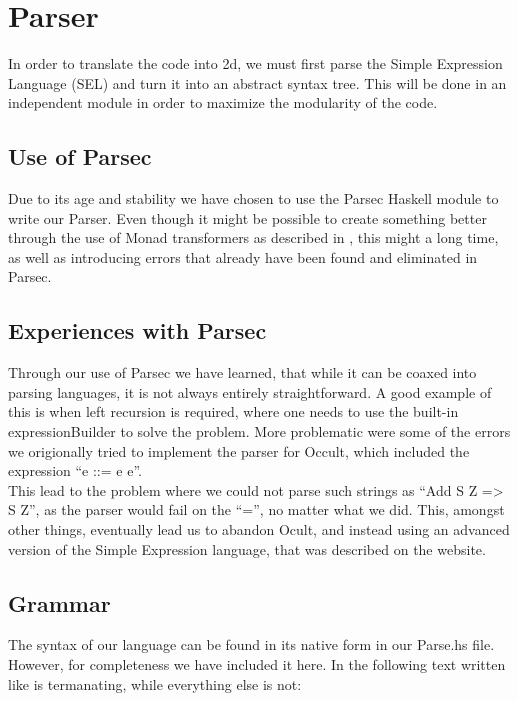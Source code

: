 \section{Parser}
In order to translate the code into 2d, we must first parse the Simple Expression Language (SEL) and turn it into an abstract syntax tree. This will be done in an independent module in order to maximize the modularity of the code.

\subsection{Use of Parsec}
Due to its age and stability we have chosen to use the Parsec Haskell module to write our Parser. Even though it might be possible to create something better through the use of Monad transformers as described in \cite{partial+parsing}, this might a long time, as well as introducing errors that already have been found and eliminated in Parsec.

\subsection{Experiences with Parsec}
Through our use of Parsec we have learned, that while it can be coaxed into parsing languages, it is not always entirely straightforward. A good example of this is when left recursion is required, where one needs to use the built-in expressionBuilder to solve the problem. More problematic were some of the errors we origionally tried to implement the parser for Occult, which included the expression ``e ::= e e''.\\

This lead to the problem where we could not parse such strings as ``Add S Z => S Z'', as the parser would fail on the ``='', no matter what we did. This, amongst other things, eventually lead us to abandon Ocult, and instead using an advanced version of the Simple Expression language, that was described on the website.

\subsection{}

\subsection{Grammar}
The syntax of our language can be found in its native form in our
Parse.hs file. However, for completeness we have included it here. In
the following text written like  is termanating, while
everything else is not:\\

